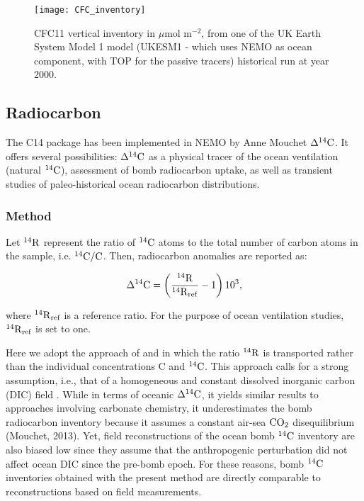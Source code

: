 \documentclass[../main/TOP_manual]{subfiles}
\begin{document}
\begin{figure}[!h]
\centering
\texttt{[image: CFC\_inventory]}
  \caption{CFC11 vertical inventory in $\mu$mol m$^{-2}$, from one of the UK Earth System Model 1 model (UKESM1 - which uses NEMO as ocean component, with TOP for the passive tracers) historical run at year 2000.}
\label{img_cfcinv}
\end{figure}


\subsection{Radiocarbon}

%

The C14 package has been implemented in NEMO by Anne Mouchet $\Delta ^{14}\mathrm{C}$.
It offers several possibilities: $\Delta ^{14}\mathrm{C}$ as a physical tracer of the ocean ventilation (natural $\mathrm{^{14}C}$), assessment of bomb radiocarbon uptake, as well as transient studies of paleo-historical ocean radiocarbon distributions.

\subsubsection{Method}

Let  $\mathrm{^{14}{R}}$ represent the ratio of $\mathrm{^{14}C}$ atoms to the total number of carbon atoms in the sample, i.e. $\mathrm{^{14}C}/\mathrm{C}$.
Then, radiocarbon anomalies are reported as:

\begin{equation}
\Delta ^{14}\mathrm{C} = \left( \frac{\mathrm{^{14}{R}}}{\mathrm{^{14}{R}}_\mathrm{ref}} - 1 \right) 10^3, \label{eq:c14dcq}
\end{equation}

where $\mathrm{^{14}{R}}_{\textrm{ref}}$ is a reference ratio.
For the purpose of ocean ventilation studies, $\mathrm{^{14}{R}}_{\textrm{ref}}$ is set to one.

Here we adopt the approach of \cite{fiadeiro_1982} and \cite{toggweiler_1989a,toggweiler_1989b} in which  the ratio $\mathrm{^{14}{R}}$ is transported rather than the individual concentrations C and $\mathrm{^{14}C}$.
This approach calls for a strong assumption, i.e., that of a homogeneous and constant dissolved inorganic carbon (DIC) field \citep{toggweiler_1989a,mouchet_2013}.
While in terms of
oceanic $\Delta ^{14}\mathrm{C}$, it yields similar results to approaches involving carbonate chemistry, it underestimates the bomb radiocarbon inventory because it assumes a constant air-sea $\mathrm{CO_2}$ disequilibrium (Mouchet, 2013).
Yet, field reconstructions of the ocean bomb $\mathrm{^{14}C}$ inventory are also biased low \citep{naegler_2009} since they assume that the anthropogenic perturbation did not affect ocean DIC since the pre-bomb epoch.
For these reasons, bomb $\mathrm{^{14}C}$ inventories obtained with the present method are directly comparable to reconstructions based on field measurements.
\end{document}
